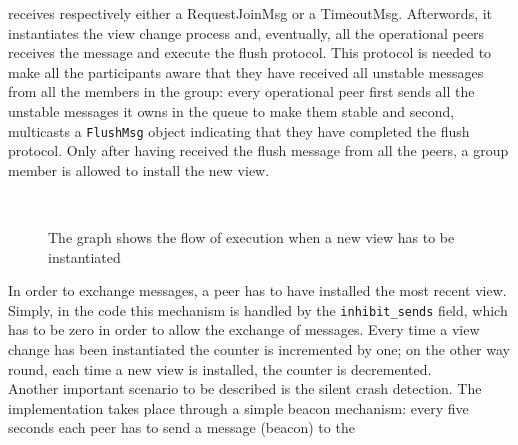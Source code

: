 \documentclass[conference]{IEEEtran}
\begin{document}
receives respectively either a RequestJoinMsg or a TimeoutMsg.
Afterwords, it instantiates the view change process and,
eventually, all the operational peers receives the message and execute
the flush protocol. This protocol is needed to make all the participants
aware that they have received all unstable messages from all the 
members in the group: every operational peer first sends all the 
unstable messages it owns in the queue to make them stable and second, 
multicasts a \texttt{FlushMsg} object indicating that they have 
completed the flush protocol. 
Only after having received the flush message from all the peers, a 
group member is allowed to install the new view. \\
\begin{figure}[ht]%
	\centering
	\\%
	\caption{The graph shows the flow of execution when a new view has
	to be instantiated}%
	\label{fig:NewView}%
\end{figure}
In order to exchange messages, a peer has to have installed the most 
recent view. Simply, in the code this mechanism is handled by the
\texttt{inhibit\_sends} field, which has to be zero in order to allow 
the exchange of messages. Every time a view change has been instantiated
the counter is incremented by one; on the other way round, each time 
a new view is installed, the counter is decremented. \\
Another important scenario to be described is the silent crash detection. 
The implementation takes place through a simple beacon mechanism:
every five seconds each peer has to send a message (beacon) to the 
\end{document}
